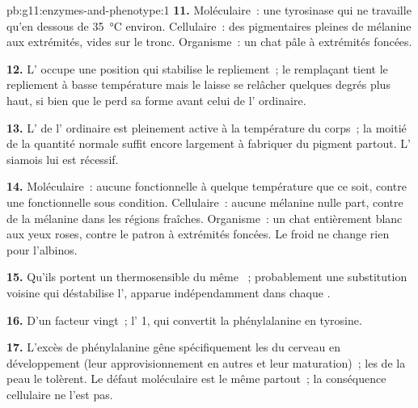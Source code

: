 \begin{solution}{pb:g11:enzymes-and-phenotype:1}
\textbf{11.} Moléculaire~: une tyrosinase qui ne travaille qu'en
dessous de \qty{35}{\celsius} environ. Cellulaire~: des 
pigmentaires pleines de mélanine aux extrémités, vides sur le tronc.
Organisme~: un chat pâle à extrémités foncées.

\textbf{12.} L' occupe une position qui stabilise le
repliement~; le remplaçant tient le repliement à basse température mais
le laisse se relâcher quelques degrés plus haut, si bien que le  perd sa forme avant celui de l' ordinaire.

\textbf{13.} L' de l' ordinaire est pleinement active à la
température du corps~; la moitié de la quantité normale suffit encore
largement à fabriquer du pigment partout. L' siamois lui est
récessif.

\textbf{14.} Moléculaire~: aucune  fonctionnelle à quelque
température que ce soit, contre une  fonctionnelle sous
condition. Cellulaire~: aucune mélanine nulle part, contre de la
mélanine dans les régions fraîches. Organisme~: un chat entièrement
blanc aux yeux roses, contre le patron à extrémités foncées. Le froid
ne change rien pour l'albinos.

\textbf{15.} Qu'ils portent un  thermosensible du même ~;
probablement une substitution voisine qui déstabilise l',
apparue indépendamment dans chaque .

\textbf{16.} D'un facteur vingt~; l' 1, qui convertit la
phénylalanine en tyrosine.

\textbf{17.} L'excès de phénylalanine gêne spécifiquement les 
du cerveau en développement (leur approvisionnement en autres  et leur maturation)~; les  de la peau le tolèrent. Le
défaut moléculaire est le même partout~; la conséquence cellulaire ne
l'est pas.


\end{solution}
